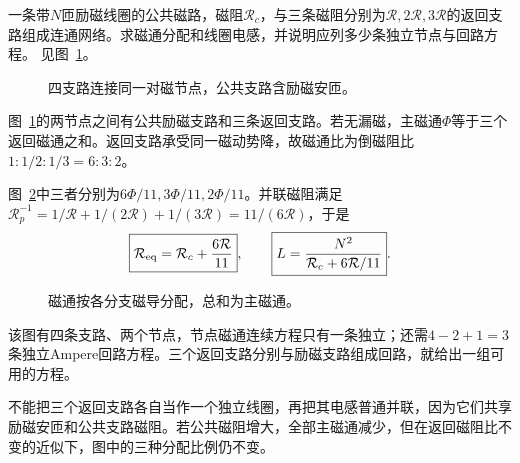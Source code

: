 \begin{exercise}[多分支磁路的方程数]\label{ex:i2-h14}
一条带$N$匝励磁线圈的公共磁路，磁阻$\mathcal R_c$，与三条磁阻分别为$\mathcal R,2\mathcal R,3\mathcal R$的返回支路组成连通网络。求磁通分配和线圈电感，并说明应列多少条独立节点与回路方程。 见图~\ref{fig:i2-h14-q}。
\end{exercise}

\begin{figure}[H]\centering
{}
\caption{四支路连接同一对磁节点，公共支路含励磁安匝。}\label{fig:i2-h14-q}
\end{figure}
\begin{solution}
图~\ref{fig:i2-h14-q}的两节点之间有公共励磁支路和三条返回支路。若无漏磁，主磁通$\Phi$等于三个返回磁通之和。返回支路承受同一磁动势降，故磁通比为倒磁阻比$1:1/2:1/3=6:3:2$。

图~\ref{fig:i2-h14-s}中三者分别为$6\Phi/11,3\Phi/11,2\Phi/11$。并联磁阻满足$\mathcal R_p^{-1}=1/\mathcal R+1/(2\mathcal R)+1/(3\mathcal R)=11/(6\mathcal R)$，于是
\[\boxed{\mathcal R_{\rm eq}=\mathcal R_c+\frac{6\mathcal R}{11}},\qquad
\boxed{L=\frac{N^2}{\mathcal R_c+6\mathcal R/11}}.
\]

\begin{figure}[H]\centering
{}
\caption{磁通按各分支磁导分配，总和为主磁通。}\label{fig:i2-h14-s}
\end{figure}

该图有四条支路、两个节点，节点磁通连续方程只有一条独立；还需$4-2+1=3$条独立Ampere回路方程。三个返回支路分别与励磁支路组成回路，就给出一组可用的方程。

不能把三个返回支路各自当作一个独立线圈，再把其电感普通并联，因为它们共享励磁安匝和公共支路磁阻。若公共磁阻增大，全部主磁通减少，但在返回磁阻比不变的近似下，图中的三种分配比例仍不变。
\end{solution}
